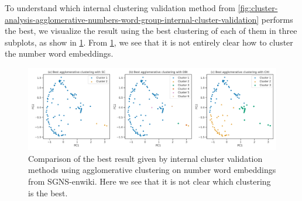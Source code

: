 To understand which internal clustering validation method from \cref{fig:cluster-analysis-agglomerative-numbers-word-group-internal-cluster-validation} performs the best, we visualize the result using the best clustering of each of them in three subplots, as show in \cref{fig:cluster-analysis-agglomerative-numbers-word-group-internal-cluster-validation-best-2d-pca}. From \cref{fig:cluster-analysis-agglomerative-numbers-word-group-internal-cluster-validation-best-2d-pca}, we see that it is not entirely clear how to cluster the number word embeddings.
\begin{figure}[H]
    \centering
    \includegraphics[width=\textwidth]{thesis/figures/cluster-analysis-agglomerative-numbers-word-group-internal-cluster-validation-best-2d-pca.pdf}
    \caption{Comparison of the best result given by internal cluster validation methods using agglomerative clustering on number word embeddings from SGNS-enwiki. Here we see that it is not clear which clustering is the best.}
    \label{fig:cluster-analysis-agglomerative-numbers-word-group-internal-cluster-validation-best-2d-pca}
\end{figure}

